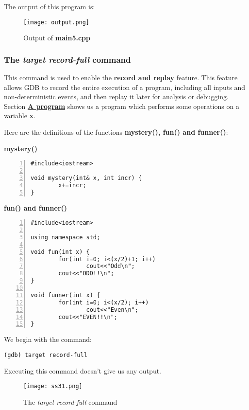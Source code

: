 \documentclass{article}
\makeatletter
\renewcommand\paragraph{\@startsection{paragraph}{4}{\z@}{-3.25ex \@plus -1ex \@minus -.2ex}{1.5ex \@plus .2ex}{\normalfont\normalsize\bfseries}}
\makeatother
\begin{document}
The output of this program is:
\begin{figure}[h]
\centering
\texttt{[image: output.png]}
\caption{Output of \textbf{main5.cpp}}
\end{figure}

\newpage
\subsubsection{The \textit{target record-full} command}
\paragraph{}
This command is used to enable the \textbf{record and replay} feature. This feature allows GDB to record the entire execution of a program, including all inputs and non-deterministic events, and then replay it later for analysis or debugging.
Section \hyperref[sec:program]{\textbf{A program}} shows us a program which performs some operations on a variable \textbf{x}.

Here are the definitions of the functions \textbf{mystery(), fun() and funner()}:


\vspace{20pt}
\textbf{mystery()}
\begin{Verbatim}[numbers=left, frame=single]
#include<iostream>

void mystery(int& x, int incr) {
        x+=incr;
}
\end{Verbatim}

\vspace{20pt}
\textbf{fun() and funner()}
\begin{Verbatim}[numbers=left, frame=single]
#include<iostream>

using namespace std;

void fun(int x) {
        for(int i=0; i<(x/2)+1; i++)
                cout<<"Odd\n";
        cout<<"ODD!!\n";
}

void funner(int x) {
        for(int i=0; i<(x/2); i++)
                cout<<"Even\n";
        cout<<"EVEN!!\n";
}
\end{Verbatim}

We begin with the command:

\begin{Verbatim}[frame=single]
(gdb) target record-full
\end{Verbatim}
\newpage
Executing this command doesn't give us any output.
\begin{figure}[h]
\centering
\texttt{[image: ss31.png]}
\caption{The \textit{target record-full} command}
\end{figure}
\end{document}
